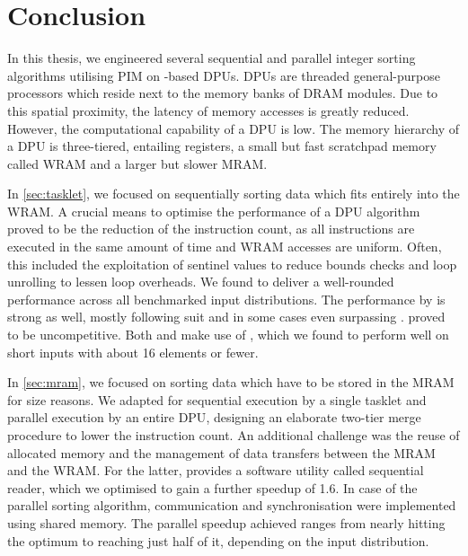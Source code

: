 \chapter{Conclusion}
\label{sec:conclusion}

In this thesis, we engineered several sequential and parallel integer sorting algorithms utilising \acf{PIM} on \upmem{}-based \acfp{DPU}.
\Acp{DPU} are threaded general-purpose processors which reside next to the memory banks of \acs{DRAM} modules.
Due to this spatial proximity, the latency of memory accesses is greatly reduced.
However, the computational capability of a \ac{DPU} is low.
The memory hierarchy of a \ac{DPU} is three-tiered, entailing registers, a small but fast scratchpad memory called \acf{WRAM} and a larger but slower \acf{MRAM}.

In \cref{sec:tasklet}, we focused on sequentially sorting data which fits entirely into the \ac{WRAM}.
A crucial means to optimise the performance of a \ac{DPU} algorithm proved to be the reduction of the instruction count, as all instructions are executed in the same amount of time and \ac{WRAM} accesses are uniform.
Often, this included the exploitation of sentinel values to reduce bounds checks and loop unrolling to lessen loop overheads.
We found \QS{} to deliver a well-rounded performance across all benchmarked input distributions.
The performance by \MS{} is strong as well, mostly following suit and in some cases even surpassing \QS{}.
\HS{} proved to be uncompetitive.
Both \QS{} and \MS{} make use of \IS{}, which we found to perform well on short inputs with about 16 elements or fewer.

In \cref{sec:mram}, we focused on sorting data which have to be stored in the \ac{MRAM} for size reasons.
We adapted \MS{} for sequential execution by a single tasklet and parallel execution by an entire \ac{DPU}, designing an elaborate two-tier merge procedure to lower the instruction count.
An additional challenge was the reuse of allocated memory and the management of data transfers between the \ac{MRAM} and the \ac{WRAM}.
For the latter, \upmem{} provides a software utility called sequential reader, which we optimised to gain a further speedup of \num{1.6}.
In case of the parallel sorting algorithm, communication and synchronisation were implemented using shared memory.
The parallel speedup achieved ranges from nearly hitting the optimum to reaching just half of it, depending on the input distribution.

